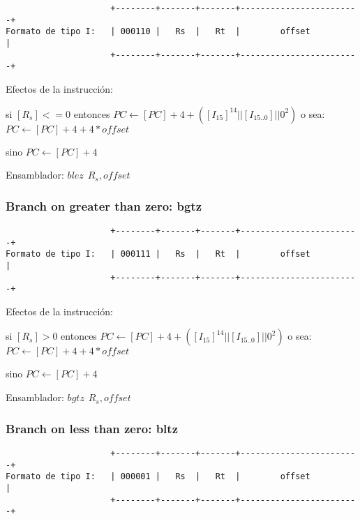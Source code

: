 \documentclass[letterpaper,11pt]{scrartcl}
\begin{document}
\begin{verbatim}
                     +--------+-------+-------+------------------------+ 
Formato de tipo I:   | 000110 |   Rs  |   Rt  |        offset          | 
                     +--------+-------+-------+------------------------+ 
\end{verbatim}

Efectos de la instrucción: 

si $[R_{s}] <= 0$ entonces $PC \leftarrow [PC] + 4 + ( [I_{15}]^{14} || [I_{15..0}] || 0^{2} )$ o sea: $PC \leftarrow [PC] + 4 + 4*offset$

sino $PC \leftarrow [PC] + 4$

Ensamblador: $blez\hspace{5pt}R_{s}, offset$


\subsubsection*{Branch on greater than zero: \textbf{bgtz}}

\begin{verbatim}
                     +--------+-------+-------+------------------------+ 
Formato de tipo I:   | 000111 |   Rs  |   Rt  |        offset          | 
                     +--------+-------+-------+------------------------+ 
\end{verbatim}

Efectos de la instrucción: 

si $[R_{s}] > 0$ entonces $PC \leftarrow [PC] + 4 + ( [I_{15}]^{14} || [I_{15..0}] || 0^{2} )$ o sea: $PC \leftarrow [PC] + 4 + 4*offset$

sino $PC \leftarrow [PC] + 4$

Ensamblador: $bgtz\hspace{5pt}R_{s}, offset$


\subsubsection*{Branch on less than zero: \textbf{bltz}}

\begin{verbatim}
                     +--------+-------+-------+------------------------+ 
Formato de tipo I:   | 000001 |   Rs  |   Rt  |        offset          | 
                     +--------+-------+-------+------------------------+ 
\end{verbatim}
\end{document}
